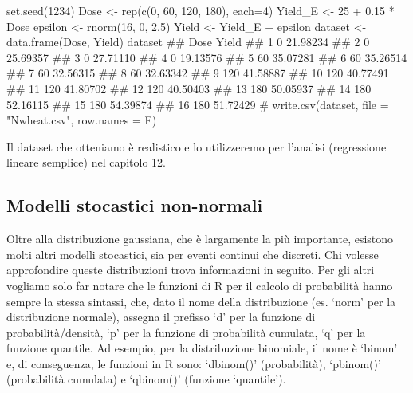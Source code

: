 \documentclass[a4paper,12pt,oneside]{book}
\newenvironment{Shaded}{}{}
\newcommand{\KeywordTok}[1]{#1}
\newcommand{\DataTypeTok}[1]{#1}
\newcommand{\DecValTok}[1]{#1}
\newcommand{\FloatTok}[1]{#1}
\newcommand{\StringTok}[1]{#1}
\newcommand{\CommentTok}[1]{#1}
\newcommand{\OperatorTok}[1]{#1}
\newcommand{\NormalTok}[1]{#1}
\begin{document}
\begin{Shaded}
\begin{Highlighting}[]
\KeywordTok{set.seed}\NormalTok{(}\DecValTok{1234}\NormalTok{)}
\NormalTok{Dose <-}\StringTok{ }\KeywordTok{rep}\NormalTok{(}\KeywordTok{c}\NormalTok{(}\DecValTok{0}\NormalTok{, }\DecValTok{60}\NormalTok{, }\DecValTok{120}\NormalTok{, }\DecValTok{180}\NormalTok{), }\DataTypeTok{each=}\DecValTok{4}\NormalTok{) }
\NormalTok{Yield_E <-}\StringTok{ }\DecValTok{25} \OperatorTok{+}\StringTok{ }\FloatTok{0.15} \OperatorTok{*}\StringTok{ }\NormalTok{Dose}
\NormalTok{epsilon <-}\StringTok{ }\KeywordTok{rnorm}\NormalTok{(}\DecValTok{16}\NormalTok{, }\DecValTok{0}\NormalTok{, }\FloatTok{2.5}\NormalTok{)}
\NormalTok{Yield <-}\StringTok{ }\NormalTok{Yield_E }\OperatorTok{+}\StringTok{ }\NormalTok{epsilon}
\NormalTok{dataset <-}\StringTok{ }\KeywordTok{data.frame}\NormalTok{(Dose, Yield)}
\NormalTok{dataset}
\CommentTok{##    Dose    Yield}
\CommentTok{## 1     0 21.98234}
\CommentTok{## 2     0 25.69357}
\CommentTok{## 3     0 27.71110}
\CommentTok{## 4     0 19.13576}
\CommentTok{## 5    60 35.07281}
\CommentTok{## 6    60 35.26514}
\CommentTok{## 7    60 32.56315}
\CommentTok{## 8    60 32.63342}
\CommentTok{## 9   120 41.58887}
\CommentTok{## 10  120 40.77491}
\CommentTok{## 11  120 41.80702}
\CommentTok{## 12  120 40.50403}
\CommentTok{## 13  180 50.05937}
\CommentTok{## 14  180 52.16115}
\CommentTok{## 15  180 54.39874}
\CommentTok{## 16  180 51.72429}
\CommentTok{# write.csv(dataset, file = "Nwheat.csv", row.names = F)}
\end{Highlighting}
\end{Shaded}

Il dataset che otteniamo è realistico e lo utilizzeremo per l'analisi (regressione lineare semplice) nel capitolo 12.

\hypertarget{modelli-stocastici-non-normali}{%
\subsection{Modelli stocastici non-normali}\label{modelli-stocastici-non-normali}}

Oltre alla distribuzione gaussiana, che è largamente la più importante, esistono molti altri modelli stocastici, sia per eventi continui che discreti. Chi volesse approfondire queste distribuzioni trova informazioni in seguito. Per gli altri vogliamo solo far notare che le funzioni di R per il calcolo di probabilità hanno sempre la stessa sintassi, che, dato il nome della distribuzione (es. `norm' per la distribuzione normale), assegna il prefisso `d' per la funzione di probabilità/densità, `p' per la funzione di probabilità cumulata, `q' per la funzione quantile. Ad esempio, per la distribuzione binomiale, il nome è `binom' e, di conseguenza, le funzioni in R sono: `dbinom()' (probabilità), `pbinom()' (probabilità cumulata) e `qbinom()' (funzione `quantile').
\end{document}
